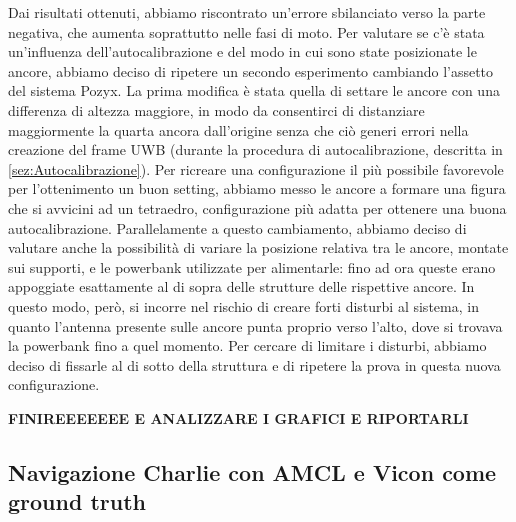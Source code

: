 Dai risultati ottenuti, abbiamo riscontrato un'errore sbilanciato verso la parte negativa, che aumenta soprattutto nelle fasi di moto. Per valutare se c'è stata un'influenza 
dell'autocalibrazione e del modo in cui sono state posizionate le ancore, abbiamo deciso di ripetere un secondo esperimento cambiando l'assetto del sistema Pozyx. La prima modifica è stata quella di settare le ancore con una differenza di altezza maggiore, in modo da consentirci 
di distanziare maggiormente la quarta ancora dall'origine senza che ciò generi errori nella creazione del frame UWB (durante la procedura di autocalibrazione, 
descritta in \ref{sez:Autocalibrazione}). Per ricreare una configurazione il più possibile favorevole per l'ottenimento un buon setting, abbiamo messo le ancore 
a formare una figura che si avvicini ad un tetraedro, configurazione più adatta per ottenere una buona autocalibrazione.
Parallelamente a questo cambiamento, abbiamo deciso di valutare anche la possibilità di variare la posizione relativa tra le ancore, montate sui supporti, e 
le powerbank utilizzate per alimentarle: fino ad ora queste erano appoggiate esattamente al di sopra delle strutture delle rispettive ancore. In questo modo, 
però, si incorre nel rischio di creare forti disturbi al sistema, in quanto l'antenna presente sulle ancore punta proprio verso l'alto, dove si trovava la powerbank fino a quel momento. 
Per cercare di limitare i disturbi, abbiamo deciso di fissarle al di sotto della struttura e di ripetere la prova in questa nuova configurazione.

\textbf{FINIREEEEEEE E ANALIZZARE I GRAFICI E RIPORTARLI }

\subsection{Navigazione Charlie con AMCL e Vicon come ground truth}

